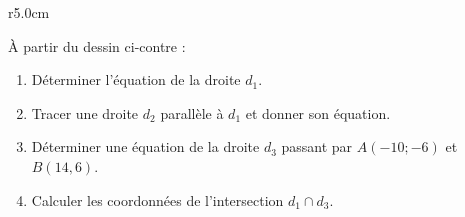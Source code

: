 
\begin{exercice}\label{exosmath-0606}

\begin{wrapfigure}{r}{5.0cm}
   \vspace{-1.5cm}        %
   \centering
   
\end{wrapfigure}

À partir du dessin ci-contre :
\begin{enumerate}
    \item
        Déterminer l'équation de la droite \( d_1\).
    \item
        Tracer une droite \( d_2\) parallèle à \( d_1\) et donner son équation.
    \item
        Déterminer une équation de la droite \( d_3\) passant par \( A(-10;-6)\) et \( B(14,6)\).
    \item
        Calculer les coordonnées de l'intersection \( d_1\cap d_3\).
\end{enumerate}


\end{exercice}
